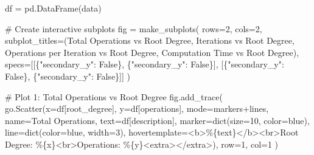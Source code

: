 \documentclass[
  letterpaper,
  DIV=11,
  numbers=noendperiod]{scrartcl}
\newenvironment{Shaded}{\begin{snugshade}}{\end{snugshade}}
\newcommand{\BuiltInTok}[1]{\textcolor[rgb]{0.00,0.23,0.31}{#1}}
\newcommand{\CommentTok}[1]{\textcolor[rgb]{0.37,0.37,0.37}{#1}}
\newcommand{\DecValTok}[1]{\textcolor[rgb]{0.68,0.00,0.00}{#1}}
\newcommand{\NormalTok}[1]{\textcolor[rgb]{0.00,0.23,0.31}{#1}}
\newcommand{\OperatorTok}[1]{\textcolor[rgb]{0.37,0.37,0.37}{#1}}
\newcommand{\SpecialCharTok}[1]{\textcolor[rgb]{0.37,0.37,0.37}{#1}}
\newcommand{\StringTok}[1]{\textcolor[rgb]{0.13,0.47,0.30}{#1}}
\newcommand{\VariableTok}[1]{\textcolor[rgb]{0.07,0.07,0.07}{#1}}
\begin{document}
\begin{Shaded}
\begin{Highlighting}[]
\NormalTok{df }\OperatorTok{=}\NormalTok{ pd.DataFrame(data)}

\CommentTok{\# Create interactive subplots}
\NormalTok{fig }\OperatorTok{=}\NormalTok{ make\_subplots(}
\NormalTok{    rows}\OperatorTok{=}\DecValTok{2}\NormalTok{, cols}\OperatorTok{=}\DecValTok{2}\NormalTok{,}
\NormalTok{    subplot\_titles}\OperatorTok{=}\NormalTok{(}\StringTok{\textquotesingle{}Total Operations vs Root Degree\textquotesingle{}}\NormalTok{, }\StringTok{\textquotesingle{}Iterations vs Root Degree\textquotesingle{}}\NormalTok{,}
                   \StringTok{\textquotesingle{}Operations per Iteration vs Root Degree\textquotesingle{}}\NormalTok{, }\StringTok{\textquotesingle{}Computation Time vs Root Degree\textquotesingle{}}\NormalTok{),}
\NormalTok{    specs}\OperatorTok{=}\NormalTok{[[\{}\StringTok{"secondary\_y"}\NormalTok{: }\VariableTok{False}\NormalTok{\}, \{}\StringTok{"secondary\_y"}\NormalTok{: }\VariableTok{False}\NormalTok{\}],}
\NormalTok{           [\{}\StringTok{"secondary\_y"}\NormalTok{: }\VariableTok{False}\NormalTok{\}, \{}\StringTok{"secondary\_y"}\NormalTok{: }\VariableTok{False}\NormalTok{\}]]}
\NormalTok{)}

\CommentTok{\# Plot 1: Total Operations vs Root Degree}
\NormalTok{fig.add\_trace(}
\NormalTok{    go.Scatter(x}\OperatorTok{=}\NormalTok{df[}\StringTok{\textquotesingle{}root\_degree\textquotesingle{}}\NormalTok{], y}\OperatorTok{=}\NormalTok{df[}\StringTok{\textquotesingle{}operations\textquotesingle{}}\NormalTok{],}
\NormalTok{               mode}\OperatorTok{=}\StringTok{\textquotesingle{}markers+lines\textquotesingle{}}\NormalTok{,}
\NormalTok{               name}\OperatorTok{=}\StringTok{\textquotesingle{}Total Operations\textquotesingle{}}\NormalTok{,}
\NormalTok{               text}\OperatorTok{=}\NormalTok{df[}\StringTok{\textquotesingle{}description\textquotesingle{}}\NormalTok{],}
\NormalTok{               marker}\OperatorTok{=}\BuiltInTok{dict}\NormalTok{(size}\OperatorTok{=}\DecValTok{10}\NormalTok{, color}\OperatorTok{=}\StringTok{\textquotesingle{}blue\textquotesingle{}}\NormalTok{),}
\NormalTok{               line}\OperatorTok{=}\BuiltInTok{dict}\NormalTok{(color}\OperatorTok{=}\StringTok{\textquotesingle{}blue\textquotesingle{}}\NormalTok{, width}\OperatorTok{=}\DecValTok{3}\NormalTok{),}
\NormalTok{               hovertemplate}\OperatorTok{=}\StringTok{\textquotesingle{}\textless{}b\textgreater{}\%}\SpecialCharTok{\{text\}}\StringTok{\textless{}/b\textgreater{}\textless{}br\textgreater{}Root Degree: \%}\SpecialCharTok{\{x\}}\StringTok{\textless{}br\textgreater{}Operations: \%}\SpecialCharTok{\{y\}}\StringTok{\textless{}extra\textgreater{}\textless{}/extra\textgreater{}\textquotesingle{}}\NormalTok{),}
\NormalTok{    row}\OperatorTok{=}\DecValTok{1}\NormalTok{, col}\OperatorTok{=}\DecValTok{1}
\NormalTok{)}


\end{Highlighting}
\end{Shaded}
\end{document}
